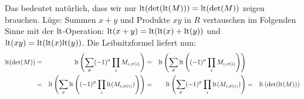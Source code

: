 Das bedeutet natürlich, dass wir nur ${\operatorname{lt}}(\det({\operatorname{lt}}(M))) = {\operatorname{lt}}(\det(M))$ zeigen brauchen.
Lüge: Summen $x+y$ und Produkte $xy$ in $R$ vertauschen im Folgenden Sinne mit der ${\operatorname{lt}}$-Operation: ${\operatorname{lt}}(x+y) = {\operatorname{lt}}({\operatorname{lt}}(x) + {\operatorname{lt}}(y))$ und ${\operatorname{lt}}(xy) = {\operatorname{lt}}({\operatorname{lt}}(x){\operatorname{lt}}(y))$.
Die Leibnitzformel liefert nun:
\begin{align*}
  {\operatorname{lt}}(\det(M))
&= &{\operatorname{lt}}\left(\sum_\sigma (-1)^\sigma \prod_i M_{i,\sigma(i)}\right)
&= &{\operatorname{lt}}\left(\sum_\sigma {\operatorname{lt}}\left((-1)^\sigma \prod_i M_{i,\sigma(i)}\right)\right)
& &
\\
&= &{\operatorname{lt}}\left(\sum_\sigma {\operatorname{lt}}\left((-1)^\sigma \prod_i {\operatorname{lt}}(M_{i,\sigma(i)})\right)\right)
&= &{\operatorname{lt}}\left(\sum_\sigma (-1)^\sigma \prod_i {\operatorname{lt}}(M_{i,\sigma(i)})\right)
&= &{\operatorname{lt}}\left(\det({\operatorname{lt}}(M))\right)
\end{align*}
